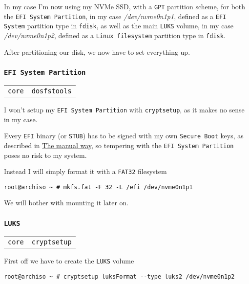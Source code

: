 \documentclass[9pt]{report}
\newenvironment{packagetable}
{\begin{longtabu}to \textwidth [b]{X[1,r]|X[1,l]}}
{\end{longtabu}}
\begin{document}
In my case I’m now using my NVMe SSD, with a \texttt{GPT} partition scheme, for both the \texttt{EFI System Partition}, in my case \textit{/dev/nvme0n1p1}, defined as a \texttt{EFI System} partition type in \texttt{fdisk}, as well as the main \texttt{LUKS} volume, in my case \textit{/dev/nvme0n1p2}, defined as a \texttt{Linux filesystem} partition type in \texttt{fdisk}.


After partitioning our disk, we now have to set everything up.



\newpage

\hypertarget{x-efi-system-partition}{\subsubsection{\texttt{EFI System Partition}}}
\begin{packagetable}
    \texttt{core} & \texttt{dosfstools} \\ 
\end{packagetable}

I won’t setup my \texttt{EFI System Partition} with \texttt{cryptsetup}, as it makes no sense in my case.


Every \texttt{EFI} binary (or \texttt{STUB}) has to be signed with my own \texttt{Secure Boot} keys, as described in \hyperlink{x-manual-secure-boot-setup}{The manual way}, so tempering with the \texttt{EFI System Partition} poses no risk to my system.


Instead I will simply format it with a \texttt{FAT32} filesystem


\begin{verbatim}
root@archiso ~ # mkfs.fat -F 32 -L /efi /dev/nvme0n1p1
\end{verbatim}

We will bother with mounting it later on.



\newpage

\hypertarget{x-luks}{\subsubsection{\texttt{LUKS}}}
\begin{packagetable}
    \texttt{core} & \texttt{cryptsetup} \\ 
\end{packagetable}

First off we have to create the \texttt{LUKS} volume


\begin{verbatim}
root@archiso ~ # cryptsetup luksFormat --type luks2 /dev/nvme0n1p2
\end{verbatim}
\end{document}
